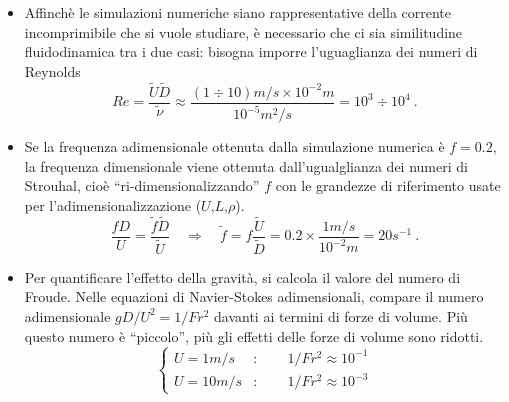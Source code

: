 \parttwo
\begin{itemize}
\item
Affinchè le simulazioni numeriche siano rappresentative della corrente
 incomprimibile che si vuole studiare, è necessario che ci sia similitudine
 fluidodinamica tra i due casi: bisogna imporre l'uguaglianza dei numeri di
 Reynolds
 \begin{equation}
   Re = \dfrac{\tilde{U}\tilde{D}}{\tilde{\nu}} \approx 
    \dfrac{(1 \div 10) m/s \times 10^{-2}m}{10^{-5}m^2/s} = 
    10^3 \div 10^4 \ .
 \end{equation}

\item 
Se la frequenza adimensionale ottenuta dalla simulazione numerica è $f=0.2$,
 la frequenza dimensionale viene ottenuta dall'ugualglianza dei numeri di 
 Strouhal, cioè ``ri-dimensionalizzando'' $f$ con le
 grandezze di riferimento usate per l'adimensionalizzazione
 ($U$,$L$,$\rho$). 
\begin{equation}
  \dfrac{f D}{U} = \dfrac{\tilde{f} \tilde{D}}{\tilde{U}} \quad \Rightarrow
  \quad \tilde{f} = f \dfrac{\tilde{U}}{\tilde{D}} 
  = 0.2 \times \dfrac{1 m/s}{10^{-2} m } = 20 s^{-1} \ .
\end{equation}

\item
Per quantificare l'effetto della gravità, si calcola il valore del numero
 di Froude. Nelle equazioni di Navier-Stokes adimensionali, compare il
 numero adimensionale $ g D / U^2 = 1 / Fr^2$ davanti ai termini di forze di
 volume. Più questo numero è ``piccolo'', più gli effetti delle forze di
 volume sono ridotti.
 \begin{equation}
 \begin{cases}
 U = 1 m/s  & : \qquad 1/Fr^2 \approx 10^{-1} \\
 U = 10 m/s & : \qquad 1/Fr^2 \approx 10^{-3}
 \end{cases}
 \end{equation}

\end{itemize} 
